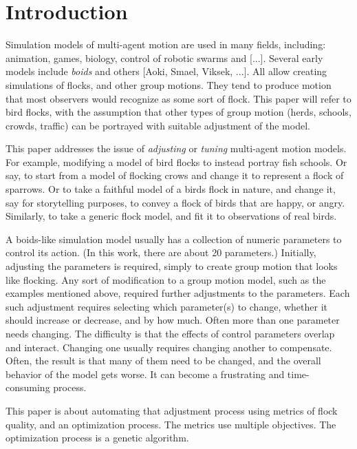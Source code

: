 \documentclass[letterpaper]{article}
\begin{document}
\section{Introduction}
\label{sec:intro}

Simulation models of multi-agent motion are used in many fields, including: animation, games, biology, control of robotic swarms and [...]. Several early models include \textit{boids} \citep{reynolds_flocks_1987} and others [Aoki, Smael, Viksek, ...]. All allow creating simulations of flocks, and other group motions.  They tend to produce motion that most observers would recognize as some sort of flock. This paper will refer to bird flocks, with the assumption that other types of group motion (herds, schools, crowds, traffic) can be portrayed with suitable adjustment of the model.
\par

This paper addresses the issue of \textit{adjusting} or \textit{tuning} multi-agent motion models. For example, modifying a model of bird flocks to instead portray fish schools. Or say, to start from a model of flocking crows and change it to represent a flock of sparrows. Or to take a faithful model of a birds flock in nature, and change it, say for storytelling purposes, to convey a flock of birds that are happy, or angry. Similarly, to take a generic flock model, and fit it to observations of real birds.
\par

A boids-like simulation model usually has a collection of numeric parameters to control its action. (In this work, there are about 20 parameters.) Initially, adjusting the parameters is required, simply to create group motion that looks like flocking. Any sort of modification to a group motion model, such as the examples mentioned above, required further adjustments to the parameters. Each such adjustment requires selecting which parameter(s) to change, whether it should increase or decrease, and by how much. Often more than one parameter needs changing. The difficulty is that the effects of control parameters overlap and interact. Changing one usually requires changing another to compensate. Often, the result is that many of them need to be changed, and the overall behavior of the model gets worse. It can become a frustrating and time-consuming process.
\par

This paper is about automating that adjustment process using metrics of flock quality, and an optimization process. The metrics use multiple objectives. The optimization process is a genetic algorithm.
\end{document}
